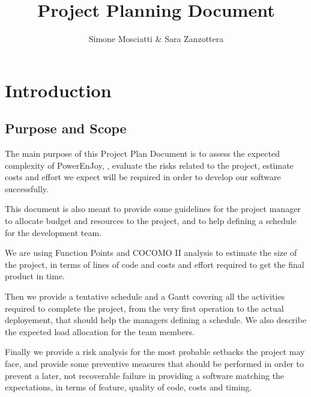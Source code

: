 \documentclass[11pt]{article} %
\title{Project Planning Document}
\author{Simone Mosciatti \& Sara Zanzottera}
\newcommand{\pecomma}{PowerEnJoy, }
\begin{document}
\maketitle
\newpage
\tableofcontents
\newpage


\section{Introduction}

\subsection{Purpose and Scope}

The main purpose of this Project Plan Document is to assess the expected complexity of \pecomma, evaluate the risks related to the project, estimate costs and effort we expect will be required in order to develop our software successfully.

This document is also meant to provide some guidelines for the project manager to allocate budget and resources to the project, and to help defining a schedule for the development team.

We are using Function Points and COCOMO II analysis to estimate the size of the project, in terms of lines of code and costs and effort required to get the final product in time. 

Then we provide a tentative schedule and a Gantt covering all the activities required to complete the project, from the very first operation to the actual deployement, that should help the managers defining a schedule. We also describe the expected load allocation for the team members.

Finally we provide a risk analysis for the most probable setbacks the project may face, and provide some preventive measures that should be performed in order to prevent a later, not recoverable failure in providing a software matching the expectations, in terms of feature, quality of code, costs and timing.
\end{document}

